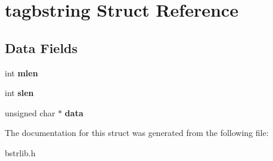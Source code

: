 \hypertarget{structtagbstring}{}\section{tagbstring Struct Reference}
\label{structtagbstring}
\subsection*{Data Fields}
\begin{DoxyCompactItemize}
\item 
\hypertarget{structtagbstring_abf47839da62089f74883d8324f5ef539}{}int {\bfseries mlen}\label{structtagbstring_abf47839da62089f74883d8324f5ef539}

\item 
\hypertarget{structtagbstring_af9a7862da5259ad58776f27cbab88180}{}int {\bfseries slen}\label{structtagbstring_af9a7862da5259ad58776f27cbab88180}

\item 
\hypertarget{structtagbstring_aeacc0105c2eed78dcc0647f89898821f}{}unsigned char $\ast$ {\bfseries data}\label{structtagbstring_aeacc0105c2eed78dcc0647f89898821f}

\end{DoxyCompactItemize}


The documentation for this struct was generated from the following file\+:\begin{DoxyCompactItemize}
\item 
bstrlib.\+h\end{DoxyCompactItemize}
